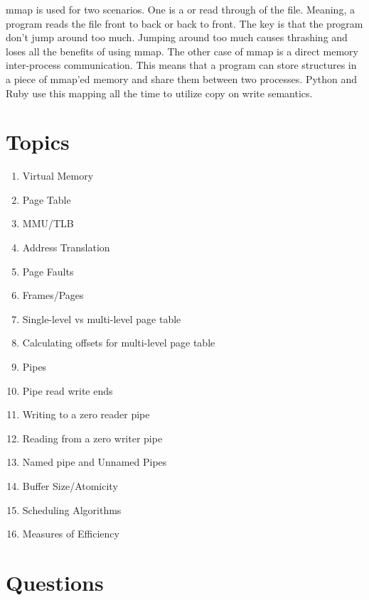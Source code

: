 mmap is used for two scenarios.
One is a  or  read through of the file.
Meaning, a program reads the file front to back or back to front.
The key is that the program don't jump around too much.
Jumping around too much causes thrashing and loses all the benefits of using mmap.
The other case of mmap is a direct memory inter-process communication.
This means that a program can store structures in a piece of mmap'ed memory and share them between two processes.
Python and Ruby use this mapping all the time to utilize copy on write semantics.

\section{Topics}

\begin{enumerate}
  \item Virtual Memory
  \item Page Table
  \item MMU/TLB
  \item Address Translation
  \item Page Faults
  \item Frames/Pages
  \item Single-level vs multi-level page table
  \item Calculating offsets for multi-level page table
  \item Pipes
  \item Pipe read write ends
  \item Writing to a zero reader pipe
  \item Reading from a zero writer pipe
  \item Named pipe and Unnamed Pipes
  \item Buffer Size/Atomicity
  \item Scheduling Algorithms
  \item Measures of Efficiency
\end{enumerate}

\section{Questions}

